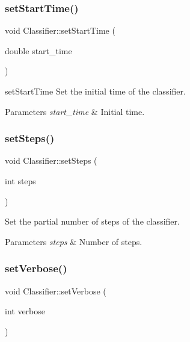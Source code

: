 \subsubsection{\texorpdfstring{set\+Start\+Time()}{setStartTime()}}
{\footnotesize\ttfamily void Classifier\+::set\+Start\+Time (\begin{DoxyParamCaption}\item[{double}]{start\+\_\+time }\end{DoxyParamCaption})}



set\+Start\+Time Set the initial time of the classifier. 


\begin{DoxyParams}{Parameters}
{\em start\+\_\+time} & Initial time. \\
\hline
\end{DoxyParams}
\mbox{\label{class_classifier_a779b6cac0351e272ee0573d919d5d060}} 
\subsubsection{\texorpdfstring{set\+Steps()}{setSteps()}}
{\footnotesize\ttfamily void Classifier\+::set\+Steps (\begin{DoxyParamCaption}\item[{int}]{steps }\end{DoxyParamCaption})\hspace{0.3cm}{\ttfamily [inline]}}



Set the partial number of steps of the classifier. 


\begin{DoxyParams}{Parameters}
{\em steps} & Number of steps. \\
\hline
\end{DoxyParams}
\mbox{\label{class_classifier_a073b94029512378ccfae3aa34aae0212}} 
\subsubsection{\texorpdfstring{set\+Verbose()}{setVerbose()}}
{\footnotesize\ttfamily void Classifier\+::set\+Verbose (\begin{DoxyParamCaption}\item[{int}]{verbose }\end{DoxyParamCaption})}



